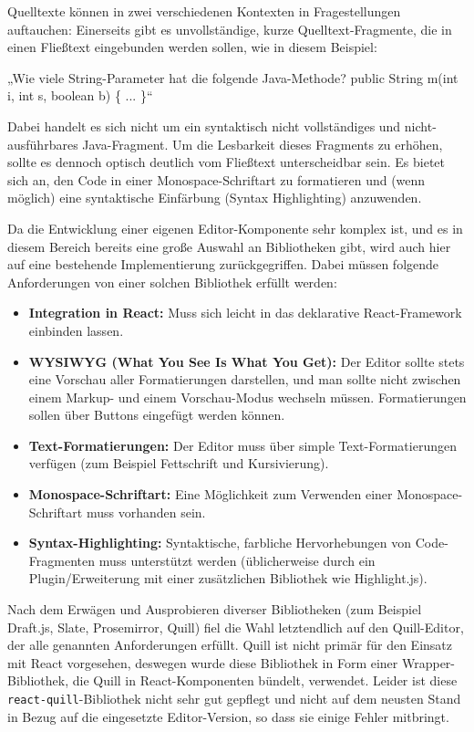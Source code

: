 Quelltexte können in zwei verschiedenen Kontexten in Fragestellungen auftauchen: Einerseits gibt es unvollständige, kurze Quelltext-Fragmente, die in einen Fließtext eingebunden werden sollen, wie in diesem Beispiel:

\begin{center}
„Wie viele String-Parameter hat die folgende Java-Methode?\newline
public String m(int i, int s, boolean b) \{ ... \}“
\end{center}

Dabei handelt es sich nicht um ein syntaktisch nicht vollständiges und nicht-ausführbares Java-Fragment. Um die Lesbarkeit dieses Fragments zu erhöhen, sollte es dennoch optisch deutlich vom Fließtext unterscheidbar sein. Es bietet sich an, den Code in einer Monospace-Schriftart zu formatieren und (wenn möglich) eine syntaktische Einfärbung (Syntax Highlighting) anzuwenden.

Da die Entwicklung einer eigenen Editor-Komponente sehr komplex ist, und es in diesem Bereich bereits eine große Auswahl an Bibliotheken gibt, wird auch hier auf eine bestehende Implementierung zurückgegriffen. Dabei müssen folgende Anforderungen von einer solchen Bibliothek erfüllt werden:

\begin{itemize}
    \item \textbf{Integration in React:}  Muss sich leicht in das deklarative React-Framework einbinden lassen.
    \item \textbf{WYSIWYG (What You See Is What You Get):} Der Editor sollte stets eine Vorschau aller Formatierungen darstellen, und man sollte nicht zwischen einem Markup- und einem Vorschau-Modus wechseln müssen. Formatierungen sollen über Buttons eingefügt werden können.
    \item \textbf{Text-Formatierungen:} Der Editor muss über simple Text-Formatierungen verfügen (zum Beispiel Fettschrift und Kursivierung).
    \item \textbf{Monospace-Schriftart:} Eine Möglichkeit zum Verwenden einer Monospace-Schriftart muss vorhanden sein.
    \item \textbf{Syntax-Highlighting:} Syntaktische, farbliche Hervorhebungen von Code-Fragmenten muss unterstützt werden (üblicherweise durch ein Plugin/Erweiterung mit einer zusätzlichen Bibliothek wie Highlight.js).
\end{itemize}

Nach dem Erwägen und Ausprobieren diverser Bibliotheken (zum Beispiel Draft.js, Slate, Prosemirror, Quill) fiel die Wahl letztendlich auf den Quill-Editor\cite{web:quill}, der alle genannten Anforderungen erfüllt. Quill ist nicht primär für den Einsatz mit React vorgesehen, deswegen wurde diese Bibliothek in Form einer Wrapper-Bibliothek, die Quill in React-Komponenten bündelt, verwendet. Leider ist diese \texttt{react-quill}-Bibliothek\cite{web:react_quill} nicht sehr gut gepflegt und nicht auf dem neusten Stand in Bezug auf die eingesetzte Editor-Version, so dass sie einige Fehler mitbringt.

